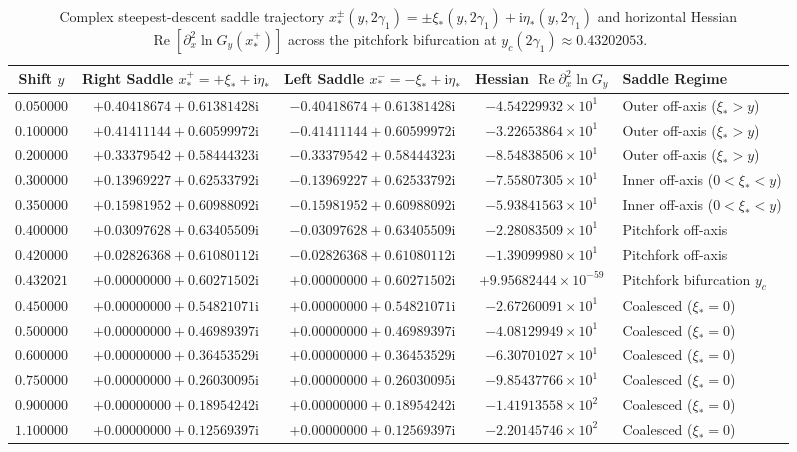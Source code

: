 \documentclass[11pt,a4paper,reqno]{amsart}
\theoremstyle{definition}
\theoremstyle{remark}
\numberwithin{equation}{section}
\newcommand{\ii}{\mathrm{i}}
\newcommand{\Rea}{\operatorname{Re}}
\begin{document}
\begin{table}[htbp]
\centering
\caption{Complex steepest-descent saddle trajectory $x_*^\pm(y, 2\gamma_1) = \pm\xi_*(y,2\gamma_1) + \ii\eta_*(y,2\gamma_1)$ and horizontal Hessian $\Rea[\partial_x^2 \ln G_y(x_*^+)]$ across the pitchfork bifurcation at $y_c(2\gamma_1) \approx 0.43202053$.}\label{tab:saddle_trajectory}
\scriptsize
\setlength{\tabcolsep}{2.1pt}
\begin{tabular}{ccccl}
\toprule
\textbf{Shift $y$} & \textbf{Right Saddle $x_*^+ = +\xi_* + \ii\eta_*$} & \textbf{Left Saddle $x_*^- = -\xi_* + \ii\eta_*$} & \textbf{Hessian $\Rea\partial_x^2\ln G_y$} & \textbf{Saddle Regime} \\
\midrule
$0.050000$ & $+0.40418674 + 0.61381428\ii$ & $-0.40418674 + 0.61381428\ii$ & $-4.54229932 \times 10^{1}$ & Outer off-axis ($\xi_* > y$) \\
$0.100000$ & $+0.41411144 + 0.60599972\ii$ & $-0.41411144 + 0.60599972\ii$ & $-3.22653864 \times 10^{1}$ & Outer off-axis ($\xi_* > y$) \\
$0.200000$ & $+0.33379542 + 0.58444323\ii$ & $-0.33379542 + 0.58444323\ii$ & $-8.54838506 \times 10^{1}$ & Outer off-axis ($\xi_* > y$) \\
$0.300000$ & $+0.13969227 + 0.62533792\ii$ & $-0.13969227 + 0.62533792\ii$ & $-7.55807305 \times 10^{1}$ & Inner off-axis ($0 < \xi_* < y$) \\
$0.350000$ & $+0.15981952 + 0.60988092\ii$ & $-0.15981952 + 0.60988092\ii$ & $-5.93841563 \times 10^{1}$ & Inner off-axis ($0 < \xi_* < y$) \\
$0.400000$ & $+0.03097628 + 0.63405509\ii$ & $-0.03097628 + 0.63405509\ii$ & $-2.28083509 \times 10^{1}$ & Pitchfork off-axis \\
$0.420000$ & $+0.02826368 + 0.61080112\ii$ & $-0.02826368 + 0.61080112\ii$ & $-1.39099980 \times 10^{1}$ & Pitchfork off-axis \\
$0.432021$ & $+0.00000000 + 0.60271502\ii$ & $+0.00000000 + 0.60271502\ii$ & $+9.95682444 \times 10^{-59}$ & Pitchfork bifurcation $y_c$ \\
$0.450000$ & $+0.00000000 + 0.54821071\ii$ & $+0.00000000 + 0.54821071\ii$ & $-2.67260091 \times 10^{1}$ & Coalesced ($\xi_* = 0$) \\
$0.500000$ & $+0.00000000 + 0.46989397\ii$ & $+0.00000000 + 0.46989397\ii$ & $-4.08129949 \times 10^{1}$ & Coalesced ($\xi_* = 0$) \\
$0.600000$ & $+0.00000000 + 0.36453529\ii$ & $+0.00000000 + 0.36453529\ii$ & $-6.30701027 \times 10^{1}$ & Coalesced ($\xi_* = 0$) \\
$0.750000$ & $+0.00000000 + 0.26030095\ii$ & $+0.00000000 + 0.26030095\ii$ & $-9.85437766 \times 10^{1}$ & Coalesced ($\xi_* = 0$) \\
$0.900000$ & $+0.00000000 + 0.18954242\ii$ & $+0.00000000 + 0.18954242\ii$ & $-1.41913558 \times 10^{2}$ & Coalesced ($\xi_* = 0$) \\
$1.100000$ & $+0.00000000 + 0.12569397\ii$ & $+0.00000000 + 0.12569397\ii$ & $-2.20145746 \times 10^{2}$ & Coalesced ($\xi_* = 0$) \\
\bottomrule
\end{tabular}
\end{table}
\end{document}
